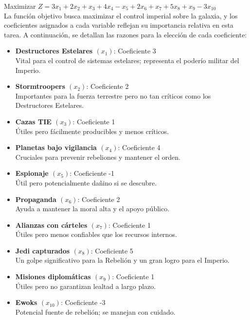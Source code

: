 \documentclass[
	spanish, %
	oneside
]{article}
\begin{document}
Maximizar \( Z = 3x_1 + 2x_2 + x_3 + 4x_4 - x_5 + 2x_6 + x_7 + 5x_8 + x_9 - 3x_{10} \) \\


\noindent La función objetivo busca maximizar el control imperial sobre la galaxia, y los coeficientes asignados a cada variable reflejan su importancia relativa en esta tarea. A continuación, se detallan las razones para la elección de cada coeficiente:

\begin{itemize}
    \item \textbf{Destructores Estelares \( (x_1) \)}: Coeficiente 3 \\
    Vital para el control de sistemas estelares; representa el poderío militar del Imperio.
    
    \item \textbf{Stormtroopers \( (x_2) \)}: Coeficiente 2 \\
    Importantes para la fuerza terrestre pero no tan críticos como los Destructores Estelares.
    
    \item \textbf{Cazas TIE \( (x_3) \)}: Coeficiente 1 \\
    Útiles pero fácilmente producibles y menos críticos.
    
    \item \textbf{Planetas bajo vigilancia \( (x_4) \)}: Coeficiente 4 \\
    Cruciales para prevenir rebeliones y mantener el orden.
    
    \item \textbf{Espionaje \( (x_5) \)}: Coeficiente -1 \\
    Útil pero potencialmente dañino si se descubre.
    
    \item \textbf{Propaganda \( (x_6) \)}: Coeficiente 2 \\
    Ayuda a mantener la moral alta y el apoyo público.
    
    \item \textbf{Alianzas con cárteles \( (x_7) \)}: Coeficiente 1 \\
    Útiles pero menos confiables que los recursos internos.
    
    \item \textbf{Jedi capturados \( (x_8) \)}: Coeficiente 5 \\
    Un golpe significativo para la Rebelión y un gran logro para el Imperio.
    
    \item \textbf{Misiones diplomáticas \( (x_9) \)}: Coeficiente 1 \\
    Útiles pero no garantizan lealtad a largo plazo.
    
    \item \textbf{Ewoks \( (x_{10}) \)}: Coeficiente -3 \\
    Potencial fuente de rebelión; se manejan con cuidado.
\end{itemize}
\end{document}
